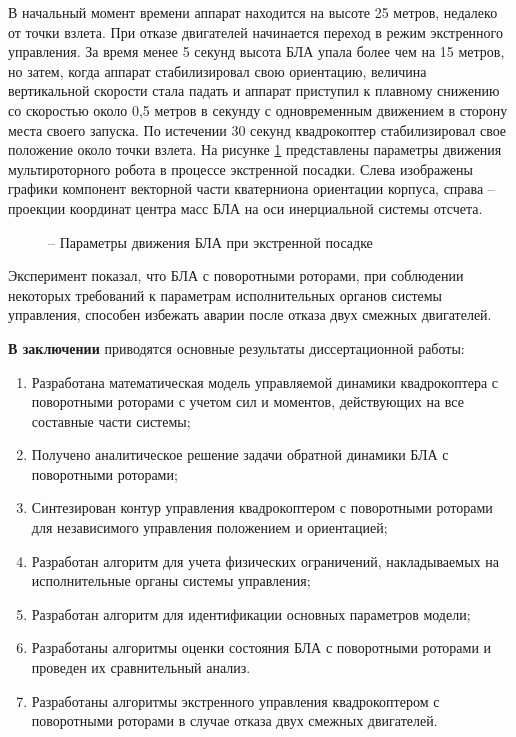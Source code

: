 В начальный момент времени аппарат находится на высоте 25 метров, недалеко от точки взлета.
При отказе двигателей начинается переход в режим экстренного управления.
За время менее 5 секунд высота БЛА упала более чем на 15 метров, но затем, когда аппарат стабилизировал свою ориентацию, величина вертикальной скорости стала падать и аппарат приступил к плавному снижению со скоростью около 0,5 метров в секунду с одновременным движением в сторону места своего запуска. По истечении 30 секунд квадрокоптер стабилизировал свое положение около точки взлета. На рисунке \ref{fig:em_coords} представлены параметры движения мультироторного робота в процессе экстренной посадки. Слева изображены графики компонент векторной части кватерниона ориентации корпуса, справа -- проекции координат центра масс БЛА на оси инерциальной системы отсчета.
\begin{figure}[H]
	
	\centering
	\hfil
	\subfloat[координата x]{\texttt{[image: em/x]}}
	
	 \hfil 
	\subfloat[координата y]{\texttt{[image: em/y]}}  
	
	\hfil
	\subfloat[координата z]{\texttt{[image: em/z]}}
	\caption{ -- Параметры движения БЛА при экстренной посадке}
	\label{fig:em_coords}
\end{figure}

Эксперимент показал, что БЛА с поворотными роторами, при соблюдении некоторых требований к параметрам исполнительных органов системы управления, способен избежать аварии после отказа двух смежных двигателей.

\textbf{В заключении} приводятся основные результаты диссертационной работы:
\begin{enumerate}
	\item Разработана математическая модель управляемой динамики квадрокоптера с поворотными роторами с учетом сил и моментов, действующих на все составные части системы;
	\item  Получено аналитическое решение задачи обратной динамики БЛА с поворотными роторами;
	\item Синтезирован контур управления квадрокоптером с поворотными роторами для независимого управления положением и ориентацией; 
	\item Разработан алгоритм для учета физических ограничений, накладываемых на исполнительные органы системы управления;
	\item Разработан алгоритм для идентификации основных параметров модели;
	\item Разработаны алгоритмы оценки состояния БЛА с поворотными роторами и проведен их сравнительный анализ.
	\item Разработаны алгоритмы экстренного управления квадрокоптером с поворотными роторами в случае отказа двух смежных двигателей.
\end{enumerate}
